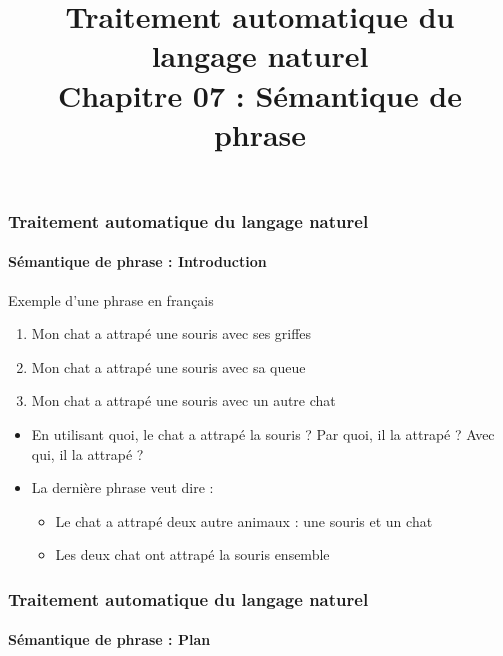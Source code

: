 \documentclass[xcolor=table]{beamer}
\title[TALN : 07- Sémantique de phrase]%
{Traitement automatique du langage naturel\\Chapitre 07 : Sémantique de phrase}
\begin{document}
	
\begin{frame}
\frametitle{Traitement automatique du langage naturel}
\framesubtitle{Sémantique de phrase : Introduction}

\begin{exampleblock}{Exemple d'une phrase en français}
	\begin{center}
		\Large\bfseries
		\begin{enumerate}
			\item Mon chat a attrapé une souris avec ses griffes 
			\item Mon chat a attrapé une souris avec sa queue
			\item Mon chat a attrapé une souris avec un autre chat
		\end{enumerate}
	\end{center}
\end{exampleblock}

\begin{itemize}
	\item En utilisant quoi, le chat a attrapé la souris ? Par quoi, il la attrapé ? Avec qui, il la attrapé ?
	\item La dernière phrase veut dire : 
	\begin{itemize}
		\item Le chat a attrapé deux autre animaux : une souris et un chat
		\item Les deux chat ont attrapé la souris ensemble
	\end{itemize}
\end{itemize}

\end{frame}

%
%

\begin{frame}
\frametitle{Traitement automatique du langage naturel}
\framesubtitle{Sémantique de phrase : Plan}

\begin{multicols}{2}
\tableofcontents
\end{multicols}
\end{frame}

\end{document}
